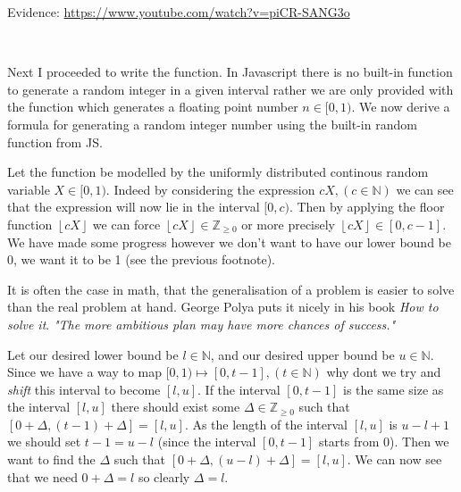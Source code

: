 {\sffamily Evidence:} \url{https://www.youtube.com/watch?v=piCR-SANG3o}\\ \vspace{0.2cm}

{\color{gray} \hrulefill} \\ \vspace{0.2cm}

Next I proceeded to write the  
function. In Javascript there is no built-in function to 
generate a random integer in a given interval rather we 
are only provided with the  function
which generates a floating point number $n \in [0, 1)$.
We now derive a formula for generating a random integer 
number using the built-in random function from JS. \\ \vspace{0.2cm}

Let the  function be modelled by 
the uniformly distributed continous random variable
$X \in [0, 1)$. Indeed by considering the expression 
$cX, (c \in \mathbb{N})$ we can see that the
expression will now lie in the interval $[0, c)$. Then by 
applying the floor function
$\left \lfloor {cX} \right \rfloor$ we can force
$\left \lfloor {cX} \right \rfloor \in \mathbb{Z}_{\geq 0}$
or more precisely 
$\left \lfloor {cX} \right \rfloor \in [0, c-1]$. We have 
made some progress however we don't want to have our lower 
bound be 0, we want it to be 1 (see the previous footnote).\\
\vspace{0.2cm}

It is often the case in math, that the generalisation of a
problem is easier to solve than the real problem at hand. 
George Polya puts it nicely in his book \textit{How to solve
it}. \textit{"The more ambitious plan may have more chances
of success."} \\ \vspace{0.2cm}

Let our desired lower bound be $l \in \mathbb{N}$, and our desired upper 
bound be $u \in \mathbb{N}$. Since we have a way to map $[0, 1) \mapsto
[0, t-1], (t \in \mathbb{N})$ why dont we try and \textit{shift}
this interval to become $[l, u]$. If the interval $[0, t-1]$ is the
same size as the interval $[l, u]$ there should exist some $\Delta \in \mathbb{Z}_{\geq 0}$ 
such that $[0 + \Delta, (t-1) + \Delta] = [l, u]$. As the length of the
interval $[l, u]$ is $u - l + 1$ we should set $t-1 = u - l$ 
(since the interval $[0, t-1]$ starts from 0). Then we want to find 
the $\Delta$ such that $[0 + \Delta, (u - l) + \Delta] = [l, u]$.
We can now see that we need $0 + \Delta = l$ so clearly
$\Delta = l$. \\ \vspace{0.2cm}

